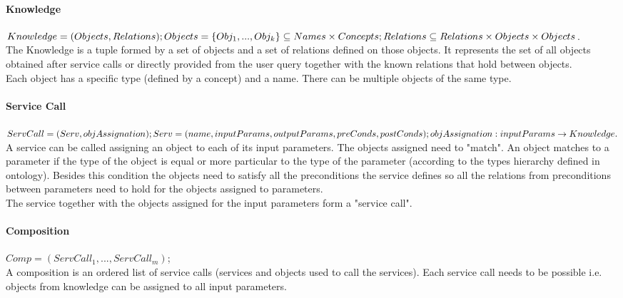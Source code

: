\documentclass[12pt]{article}
\theoremstyle{definition}
\begin{document}
	\paragraph{Knowledge}
		$ Knowledge = (Objects, Relations); \\
		  Objects = \{Obj_1, ..., Obj_k\} \subseteq Names \times Concepts; \\
		  Relations \subseteq Relations \times Objects \times Objects$. \\
		The Knowledge is a tuple formed by a set of objects and a set of relations defined on those objects. It represents the set of all objects obtained after service calls or directly provided from the user query together with the known relations that hold between objects.\\
		Each object has a specific type (defined by a concept) and a name. There can be multiple objects of the same type.
	\par
	
	\paragraph{Service Call}
		$ ServCall = (Serv, objAssignation); \\
		  Serv = (name, inputParams, outputParams, preConds, postConds); \\
		  objAssignation : inputParams \to Knowledge.$ \\
		A service can be called assigning an object to each of its input parameters. The objects assigned need to "match". An object matches to a parameter if the type of the object is equal or more particular to the type of the parameter (according to the types hierarchy defined in ontology). Besides this condition the objects need to satisfy all the preconditions the service defines so all the relations from preconditions between parameters need to hold for the objects assigned to parameters.\\
		The service together with the objects assigned for the input parameters form a "service call".
	\par
	
	\paragraph{Composition}
		$ Comp = (ServCall_1, ..., ServCall_m)$; \\
		A composition is an ordered list of service calls (services and objects used to call the services). Each service call needs to be possible i.e. objects from knowledge can be assigned to all input parameters.
	\par
	
\end{document}
